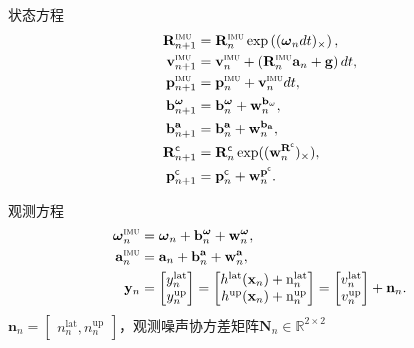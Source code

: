 \documentclass{beamer} %
\begin{document}
\begin{frame}{状态方程}    
    \begin{align*} 
        \mathbf {R}_{n+1}^{\textsc {imu}} &= \mathbf {R}_n^{\textsc {imu}} \exp \left((\boldsymbol{\omega }_n dt)_{\times} \right), \\
        \mathbf {v}_{n+1}^{\textsc {imu}} &= \mathbf {v}_n^{\textsc {imu}} + \left(\mathbf {R}_n^{\textsc {imu}}\mathbf {a}_n + \mathbf {g}\right)dt, \\
        \mathbf {p}_{n+1}^{\textsc {imu}} &= \mathbf {p}_n^{\textsc {imu}} + \mathbf {v}_n^{\textsc {imu}} dt, \\
        \mathbf {b}_{n+1}^{\boldsymbol{\omega }} &= \mathbf {b}_{n}^{\boldsymbol{\omega }} + \mathbf {w}^{\mathbf {b}_{\omega }}_{n}, \\ 
        \mathbf {b}_{n+1}^{\mathbf {a}} &= \mathbf {b}_{n}^{\mathbf {a}} + \mathbf {w}^{\mathbf {b}_{\mathbf {a}}}_{n}, \\
        \mathbf {R}_{n+1}^{\mathsf {c}} &=\mathbf {R}_n^{\mathsf {c}}\exp ((\mathbf {w}_n^{\mathbf {R}^{\mathsf {c}}})_{\times}), \\
        \mathbf {p}_{n+1}^{\mathsf {c}} &=\mathbf {p}_n^{\mathsf {c}}+ \mathbf {w}_n^{\mathbf {p}^{\mathsf {c}}}. 
    \end{align*}
\end{frame}

\begin{frame}{观测方程}
    \begin{align*} 
        \boldsymbol{\omega }_n^{\textsc {imu}} &= \boldsymbol{\omega }_n + \mathbf {b}_{n}^{\boldsymbol{\omega }} + \mathbf {w}_{n}^{\boldsymbol{\omega }}, \\ 
        \mathbf {a}^{\textsc {imu}}_n &= \mathbf {a}_n + \mathbf {b}_{n}^{\mathbf {a}} + \mathbf {w}_{n}^{\mathbf {a}}, \\
        \mathbf {y}_{n} &= \begin{bmatrix}y_{n}^{\mathrm{lat}} \\ y_{n}^{\mathrm{up}} \end{bmatrix} = \begin{bmatrix}h^{\mathrm{lat}}(\mathbf {x}_{n})+\mathrm{n}_{n}^{\mathrm{lat}} \\ h^{\mathrm{up}}(\mathbf {x}_{n})+\mathrm{n}_{n}^{\mathrm{up}} \end{bmatrix} = \begin{bmatrix}v_n^{\mathrm{lat}} \\ v_n^{\mathrm{up}} \end{bmatrix}+ \mathbf{n}_n.
    \end{align*}
    $ \mathbf{n}_n=\begin{bmatrix}n_n^{\mathrm{lat}},n_n^{\mathrm{up}}\end{bmatrix} $，观测噪声协方差矩阵$ \mathbf{N}_n\in\mathbb{R}^{2\times2} $
\end{frame}
\end{document}
